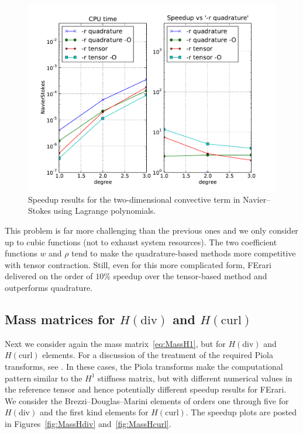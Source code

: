 \begin{figure}
  \centering
  \includegraphics[width=\largefig]{chapters/kirby-3/pdf/NavierStokes.pdf}
  \caption{Speedup results for the two-dimensional convective term
    in Navier--Stokes using Lagrange polynomials.}
  \label{fig:NavierStokes}
\end{figure}

This problem is far more challenging than the previous ones and we
only consider up to cubic functions (not to exhaust system
resources). The two coefficient functions $ w $ and $ \rho $ tend to
make the quadrature-based methods more competitive with tensor
contraction.  Still, even for this more complicated form, FErari
delivered on the order of $ 10\% $ speedup over the tensor-based
method and outperforms quadrature.

\subsection{Mass matrices for $H(\mathrm{div})$ and $H(\mathrm{curl})$}

Next we consider again the mass matrix~\eqref{eq:MassH1}, but for $
H(\mathrm{div})$ and $H(\mathrm{curl})$ elements. For a discussion of
the treatment of the required Piola transforms,
see \citet{RognesKirbyLogg2009}. In these cases, the Piola transforms
make the computational pattern similar to the $ H^1 $ stiffness
matrix, but with different numerical values in the reference tensor
and hence potentially different speedup results for FErari. We
consider the Brezzi--Douglas--Marini elements of orders one through
five for $H(\mathrm{div})$ and the first kind \nedelec{} elements
for $H(\mathrm{curl}) $. The speedup plots are posted in
Figures~\ref{fig:MassHdiv} and~\ref{fig:MassHcurl}.


